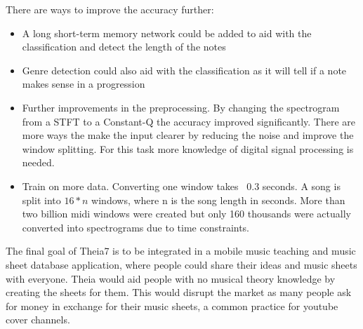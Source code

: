 \par

There are ways to improve the accuracy further:

\begin{itemize}
	\item A long short-term memory network could be added to aid with the classification and detect the length of the notes
	\item Genre detection could also aid with the classification as it will tell if a note makes sense in a progression
	\item Further improvements in the preprocessing. By changing the spectrogram from a STFT to a Constant-Q the accuracy improved significantly. There are more ways the make the input clearer by reducing the noise and improve the window splitting. For this task more knowledge of digital signal processing is needed.
	\item Train on more data. Converting one window takes ~0.3 seconds. A song is split into $16*n$ windows, where n is the song length in seconds. More than two billion midi windows were created but only 160 thousands were actually converted into spectrograms due to time constraints.
\end{itemize}

The final goal of Theia7 is to be integrated in a mobile music teaching and music sheet database application, where people could share their ideas and music sheets with everyone. Theia would aid people with no musical theory knowledge by creating the sheets for them. This would disrupt the market as many people ask for money in exchange for their music sheets, a common practice for youtube cover channels.